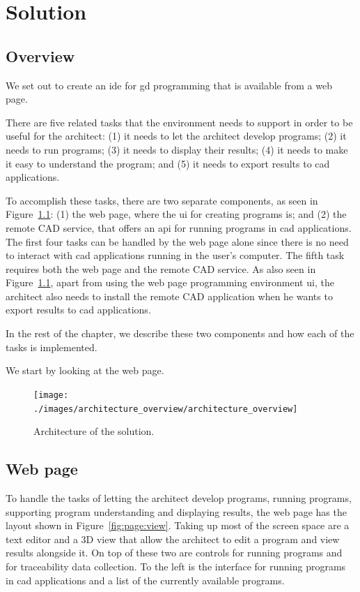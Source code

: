 
\chapter{Solution}
\label{chapter:solution}


\section{Overview}
We set out to create an \gls{ide} for \gls{gd} programming that is available from a web page.

There are five related tasks that the environment needs to support in order to be useful for the architect:
(1) it needs to let the architect develop programs;
(2) it needs to run programs;
(3) it needs to display their results;
(4) it needs to make it easy to understand the program;
and (5) it needs to export results to \gls{cad} applications.

To accomplish these tasks, there are two separate components, as seen in Figure~\ref{fig:archi:sol}: (1) the web page, where the \gls{ui} for creating programs is; and (2) the remote CAD service, that offers an \gls{api} for running programs in \gls{cad} applications.
The first four tasks can be handled by the web page alone since there is no need to interact with \gls{cad} applications running in the user's computer.
The fifth task requires both the web page and the remote CAD service.
As also seen in Figure~\ref{fig:archi:sol}, apart from using the web page programming environment \gls{ui}, the architect also needs to install the remote CAD application when he wants to export results to \gls{cad} applications.

In the rest of the chapter, we describe these two components and how each of the tasks is implemented.

We start by looking at the web page.

\begin{figure}
  \centering
  \texttt{[image: ./images/architecture\_overview/architecture\_overview]}
  \caption{Architecture of the solution.}
  \label{fig:archi:sol}
\end{figure}


\section{Web page}
To handle the tasks of letting the architect develop programs, running programs, supporting program understanding and displaying results, the web page has the layout shown in Figure~\ref{fig:page:view}.
Taking up most of the screen space are a text editor and a 3D view that allow the architect to edit a program and view results alongside it.
On top of these two are controls for running programs and for traceability data collection.
To the left is the interface for running programs in \gls{cad} applications and a list of the currently available programs.

